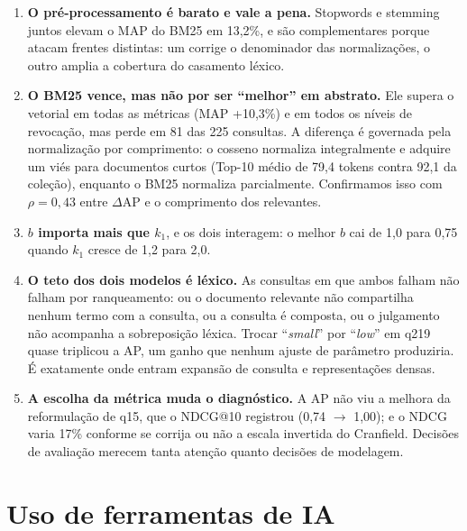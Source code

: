 \documentclass[10pt,twocolumn,a4paper]{article}
\begin{document}
\begin{enumerate}\setlength{\itemsep}{2pt}
\item \textbf{O pré-processamento é barato e vale a pena.} Stopwords e stemming
juntos elevam o MAP do BM25 em 13,2\%, e são complementares porque atacam frentes
distintas: um corrige o denominador das normalizações, o outro amplia a cobertura
do casamento léxico.

\item \textbf{O BM25 vence, mas não por ser ``melhor'' em abstrato.} Ele supera o
vetorial em todas as métricas (MAP +10,3\%) e em todos os níveis de revocação,
mas perde em 81 das 225 consultas. A diferença é governada pela normalização por
comprimento: o cosseno normaliza integralmente e adquire um viés para documentos
curtos (Top-10 médio de 79,4 tokens contra 92,1 da coleção), enquanto o BM25
normaliza parcialmente. Confirmamos isso com $\rho = 0{,}43$ entre $\Delta$AP e o
comprimento dos relevantes.

\item \textbf{$b$ importa mais que $k_1$}, e os dois interagem: o melhor $b$ cai
de 1,0 para 0,75 quando $k_1$ cresce de 1,2 para 2,0.

\item \textbf{O teto dos dois modelos é léxico.} As consultas em que ambos falham
não falham por ranqueamento: ou o documento relevante não compartilha nenhum
termo com a consulta, ou a consulta é composta, ou o julgamento não acompanha a
sobreposição léxica. Trocar ``\textit{small}'' por ``\textit{low}'' em q219 quase
triplicou a AP, um ganho que nenhum ajuste de parâmetro produziria. É exatamente
onde entram expansão de consulta e representações densas.

\item \textbf{A escolha da métrica muda o diagnóstico.} A AP não viu a melhora da
reformulação de q15, que o NDCG@10 registrou (0,74 $\to$ 1,00); e o NDCG varia
17\% conforme se corrija ou não a escala invertida do Cranfield. Decisões de
avaliação merecem tanta atenção quanto decisões de modelagem.
\end{enumerate}

\section{Uso de ferramentas de IA}
\end{document}
